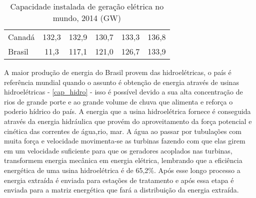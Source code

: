 \begin{table}[!ht]
\begin{tabular}{lccccc}
		\rowcolor[HTML]{DDDDDD} 
		Canadá                                       & 132,3                                & 132,9                                & 130,7                                & 133,3                                & 136,8                                                                            \\
		Brasil                                       & 11,3                                 & 117,1                                & 121,0                                & 126,7                                & 133,9                                                                           
	\end{tabular}
	\caption{Capacidade instalada de geração elétrica no mundo, 2014 (GW)}
	\label{cap_ele}
\end{table}

A maior produção de energia do Brasil provem das hidroelétricas, o país é referência mundial quando o assunto é obtenção de energia através de
usinas hidroelétricas - \autoref{cap_hidro} - isso é possível devido a sua alta concentração de rios de grande porte e ao grande volume de chuva
que alimenta e reforça o poderio hídrico do país. A energia que a usina hidroelétrica fornece é conseguida através da energia hidráulica que provém
do aproveitamento da força potencial e cinética das correntes de água,rio, mar. A água ao passar por tubulações com muita força e velocidade 
movimenta-se as turbinas fazendo com que elas girem em um velocidade suficiente para que os geradores acoplados nas turbinas, transformem energia
mecânica em energia elétrica, lembrando que a eficiência energética de uma usina hidroelétrica é de 65,2\%. Após esse longo processo a energia 
extraída é enviada para estações de tratamento e após essa etapa é enviada para a matriz energética que fará a distribuição da energia extraída. 

